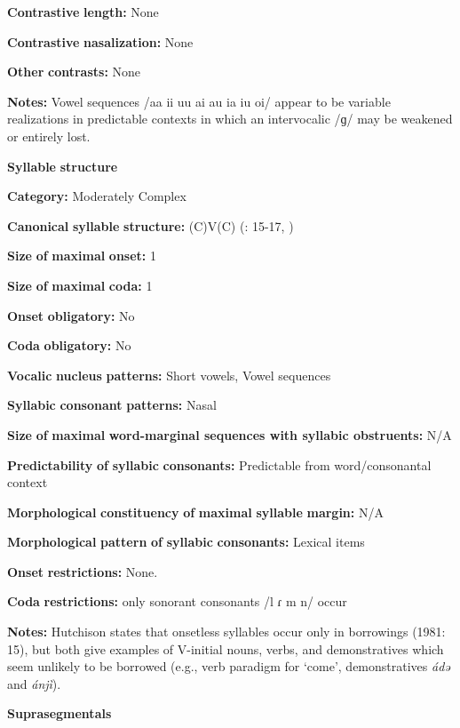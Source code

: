 \textbf{Contrastive} \textbf{length:} None

\textbf{Contrastive} \textbf{nasalization:} None

\textbf{Other} \textbf{contrasts:} None

\textbf{Notes:} Vowel sequences /aa ii uu ai au ia iu oi/ appear to be variable realizations in predictable contexts in which an intervocalic /ɡ/ may be weakened or entirely lost.

\textbf{Syllable} \textbf{structure}

\textbf{Category:} Moderately Complex

\textbf{Canonical} \textbf{syllable} \textbf{structure:} (C)V(C) (\citealt{Hutchison1981}: 15-17, \citealt{Cyffer1998})

\textbf{Size} \textbf{of} \textbf{maximal} \textbf{onset:} 1

\textbf{Size} \textbf{of} \textbf{maximal} \textbf{coda:} 1

\textbf{Onset} \textbf{obligatory:} No

\textbf{Coda} \textbf{obligatory:} No

\textbf{Vocalic} \textbf{nucleus} \textbf{patterns:} Short vowels, Vowel sequences

\textbf{Syllabic} \textbf{consonant} \textbf{patterns:} Nasal

\textbf{Size} \textbf{of} \textbf{maximal} \textbf{word{}-marginal sequences with syllabic obstruents:} N/A

\textbf{Predictability} \textbf{of} \textbf{syllabic} \textbf{consonants:} Predictable from word/consonantal context

\textbf{Morphological} \textbf{constituency} \textbf{of} \textbf{maximal} \textbf{syllable} \textbf{margin:} N/A

\textbf{Morphological} \textbf{pattern} \textbf{of} \textbf{syllabic} \textbf{consonants:} Lexical items

\textbf{Onset} \textbf{restrictions:} None.

\textbf{Coda} \textbf{restrictions:} only sonorant consonants /l ɾ m n/ occur \citep[15]{Hutchison1981}

\textbf{Notes:} Hutchison states that onsetless syllables occur only in borrowings (1981: 15), but both \citet{HutchisonCyffer1998} give examples of V-initial nouns, verbs, and demonstratives which seem unlikely to be borrowed (e.g., verb paradigm for ‘come’, demonstratives \textit{ádə} and \textit{ánjì}).

\textbf{Suprasegmentals}

